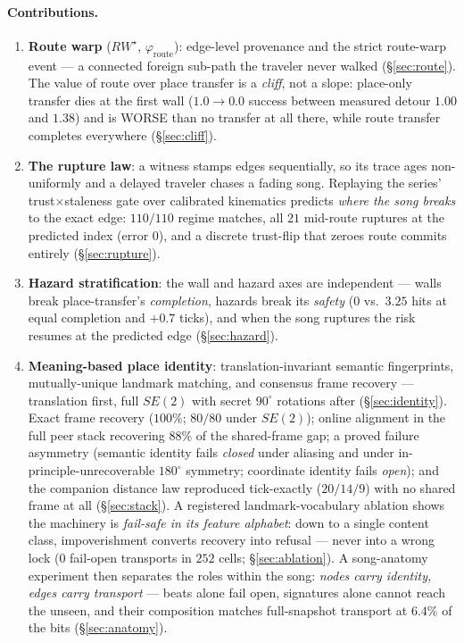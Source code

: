 \documentclass{article}
\newcommand{\rwstar}{RW^{\star}}
\newcommand{\phiroute}{\varphi_{\mathrm{route}}}
\begin{document}
\paragraph{Contributions.}
\begin{enumerate}[leftmargin=20pt,itemsep=2pt,topsep=2pt]
\item \textbf{Route warp} ($\rwstar$, $\phiroute$): edge-level
  provenance and the strict route-warp event --- a connected foreign
  sub-path the traveler never walked (\S\ref{sec:route}). The value of
  route over place transfer is a \emph{cliff}, not a slope: place-only
  transfer dies at the first wall ($1.0 \to 0.0$ success between
  measured detour $1.00$ and $1.38$) and is WORSE than no transfer at
  all there, while route transfer completes everywhere
  (\S\ref{sec:cliff}).
\item \textbf{The rupture law}: a witness stamps edges sequentially,
  so its trace ages non-uniformly and a delayed traveler chases a
  fading song. Replaying the series' trust$\times$staleness gate over
  calibrated kinematics predicts \emph{where the song breaks} to the
  exact edge: $110/110$ regime matches, all $21$ mid-route ruptures at
  the predicted index (error $0$), and a discrete trust-flip that
  zeroes route commits entirely (\S\ref{sec:rupture}).
\item \textbf{Hazard stratification}: the wall and hazard axes are
  independent --- walls break place-transfer's \emph{completion},
  hazards break its \emph{safety} ($0$ vs.\ $3.25$ hits at equal
  completion and $+0.7$ ticks), and when the song ruptures the risk
  resumes at the predicted edge (\S\ref{sec:hazard}).
\item \textbf{Meaning-based place identity}: translation-invariant
  semantic fingerprints, mutually-unique landmark matching, and
  consensus frame recovery --- translation first, full $SE(2)$ with
  secret $90^\circ$ rotations after (\S\ref{sec:identity}). Exact
  frame recovery ($100\%$; $80/80$ under $SE(2)$); online alignment in
  the full peer stack recovering $88\%$ of the shared-frame gap; a
  proved failure asymmetry (semantic identity fails \emph{closed}
  under aliasing and under in-principle-unrecoverable $180^\circ$
  symmetry; coordinate identity fails \emph{open}); and the companion
  distance law reproduced tick-exactly ($20/14/9$) with no shared
  frame at all (\S\ref{sec:stack}). A registered landmark-vocabulary
  ablation shows the machinery is \emph{fail-safe in its feature
  alphabet}: down to a single content class, impoverishment converts
  recovery into refusal --- never into a wrong lock ($0$ fail-open
  transports in $252$ cells; \S\ref{sec:ablation}). A song-anatomy
  experiment then separates the roles within the song: \emph{nodes
  carry identity, edges carry transport} --- beats alone fail open,
  signatures alone cannot reach the unseen, and their composition
  matches full-snapshot transport at $6.4\%$ of the bits
  (\S\ref{sec:anatomy}).
\end{enumerate}
\end{document}

